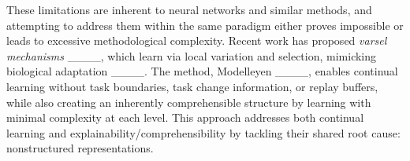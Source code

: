 

These limitations are inherent to neural networks and similar methods, and attempting to address them within the same paradigm either proves impossible or leads to excessive methodological complexity. Recent work has proposed \textit{varsel mechanisms} ____, which learn via local variation and selection, mimicking biological adaptation ____. The method, Modelleyen ____, enables continual learning without task boundaries, task change information, or replay buffers, while also creating an inherently comprehensible structure by learning with minimal complexity at each level. This approach addresses both continual learning and explainability/comprehensibility by tackling their shared root cause: nonstructured representations.